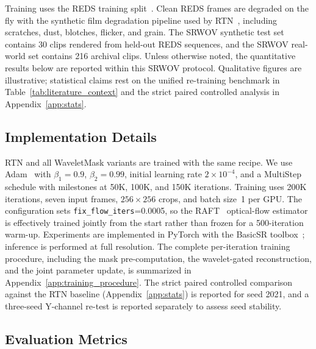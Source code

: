 {Training uses the REDS training split~\cite{nah2019reds}. Clean REDS frames are degraded on the fly with the synthetic film degradation pipeline used by RTN~\cite{rtn2022}, including scratches, dust, blotches, flicker, and grain. The SRWOV synthetic test set contains 30 clips rendered from held-out REDS sequences, and the SRWOV real-world set contains 216 archival clips. Unless otherwise noted, the quantitative results below are reported within this SRWOV protocol. Qualitative figures are illustrative; statistical claims rest on the unified re-training benchmark in Table~\ref{tab:literature_context} and the strict paired controlled analysis in Appendix~\ref{app:stats}.

\subsection{Implementation Details}\label{subsec:implementation}

RTN and all WaveletMask variants are trained with the same recipe. We use Adam~\cite{kingma2015adam} with $\beta_1=0.9$, $\beta_2=0.99$, initial learning rate $2\times10^{-4}$, and a MultiStep schedule with milestones at 50K, 100K, and 150K iterations. Training uses 200K iterations, seven input frames, $256\times256$ crops, and batch size~1 per GPU. The configuration sets \texttt{fix\_flow\_iters}=0.0005, so the RAFT~\cite{teed2020raft} optical-flow estimator is effectively trained jointly from the start rather than frozen for a 500-iteration warm-up. Experiments are implemented in PyTorch with the BasicSR toolbox~\cite{wang2022basicsr}; inference is performed at full resolution. The complete per-iteration training procedure, including the mask pre-computation, the wavelet-gated reconstruction, and the joint parameter update, is summarized in Appendix~\ref{app:training_procedure}. The strict paired controlled comparison against the RTN baseline (Appendix~\ref{app:stats}) is reported for seed 2021, and a three-seed Y-channel re-test is reported separately to assess seed stability.

\subsection{Evaluation Metrics}\label{subsec:metrics}

}
